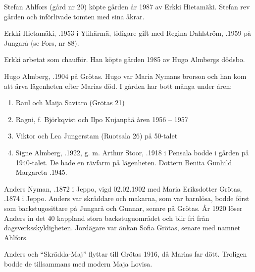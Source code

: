 


Stefan Ahlfors (gård nr 20) köpte gården år 1987 av Erkki Hietamäki. Stefan rev gården och införlivade tomten med sina åkrar.\jhvspace{}


Erkki Hietamäki, .1953 i Ylihärmä, tidigare gift med Regina Dahlström, .1959  på Jungarå (se Fors, nr 88).
\begin{jhchildren}
  \item {}
  \item {}
\end{jhchildren}

Erkki arbetat som chaufför. Han köpte gården 1985 av Hugo Almbergs dödsbo.


Hugo Almberg, .1904 på Grötas. Hugo var Maria Nymans brorson och han kom att ärva lägenheten efter Marias död. I gården har bott många  under åren:
\begin{enumerate}
  \item Raul och Maija Saviaro (Grötas  21)
  \item Ragni, f. Björkqvist och Ilpo Kujanpää åren 1956 – 1957
  \item Viktor och Lea Jungerstam (Ruotsala 26) på 50-talet
  \item Signe Almberg, .1922, g. m. Arthur Stoor, .1918  i Pensala bodde i gården på 1940-talet. De hade en rävfarm på lägenheten. Dottern Benita Gunhild Margareta .1945.
\end{enumerate}


Anders Nyman, .1872 i Jeppo, vigd 02.02.1902 med Maria Eriksdotter Grötas, .1874 i Jeppo. Anders var skräddare och makarna, som var barnlösa, bodde först som backstugosittare på Jungarå och Gunnar, senare på Grötas. År 1920 löser Anders in det 40 kappland stora backstuguområdet och blir fri från dagsverksskyldigheten. Jordägare var änkan Sofia Grötas, senare  med namnet Ahlfors.

Anders och ``Skrädda-Maj'' flyttar till Grötas 1916, då Marias far dött. Troligen bodde de tillsammans med modern Maja Lovisa.

